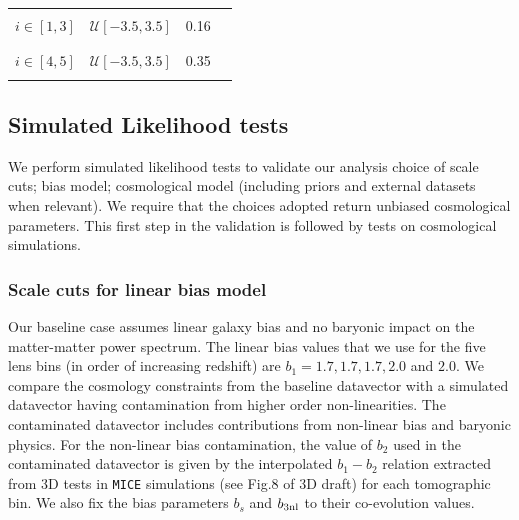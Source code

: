 \documentclass[fleqn,usenatbib]{mnras}
\newcommand{\mice}{\texttt{MICE} }
\begin{document}
\begin{table}
\begin{tabular}{|c| c c c|}
& \shortstack[c]{$b_2^{i}\sigma^2_8$\\ $i \in [1,3]$}  & $\mathcal{U}[-3.5, 3.5]$ & 0.16\\ 
& & & \\
& \shortstack[c]{$b_2^{i}\sigma^2_8$\\ $i \in [4,5]$}  & $\mathcal{U}[-3.5, 3.5]$ & 0.35\\ 
& & & \\

\hline
\end{tabular}
\end{table}



\subsection{Simulated Likelihood tests}\label{sec:simlike_analysis}


We perform simulated likelihood tests to validate our analysis choice of scale cuts; bias model; cosmological model (including priors and external datasets when relevant). We require that the choices adopted  return unbiased cosmological parameters. This first step in the validation is followed by tests on cosmological simulations. 

\subsubsection{Scale cuts for linear bias model}



Our baseline case assumes linear galaxy bias and no baryonic impact on the matter-matter  power spectrum. The linear bias values that we use for the five lens bins (in order of increasing redshift) are $b_1 = 1.7, 1.7, 1.7, 2.0$ and  $2.0$. We compare the cosmology constraints from the baseline datavector with a simulated datavector having contamination from higher order non-linearities. The contaminated datavector includes contributions from non-linear bias and baryonic physics. For the non-linear bias contamination, the value of $b_2$ used in the contaminated datavector is given by the interpolated $b_1-b_2$ relation extracted from 3D tests in \mice simulations (see Fig.8 of 3D draft) for each tomographic bin. We also fix the bias parameters $b_s$ and $b_{\rm 3nl}$ to their co-evolution values. 
\end{document}
